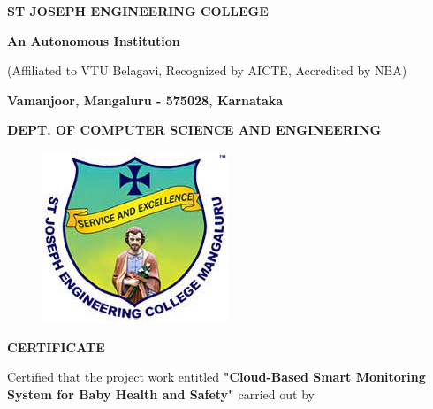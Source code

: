 \documentclass[12pt,a4paper]{report}
\begin{document}
\begin{center}
    \LARGE \textbf{ST JOSEPH ENGINEERING COLLEGE}
    \par
    \Large \textbf{An Autonomous Institution}
    \par \large{(Affiliated to VTU Belagavi, Recognized by AICTE, Accredited by NBA)}
    \par \vspace{3pt}
    \large \textbf{Vamanjoor, Mangaluru - 575028, Karnataka}
    \par \vspace{12pt}
    \par
    \large \textbf{DEPT. OF COMPUTER SCIENCE AND ENGINEERING}
    \par
    \begin{figure}[hbtp]
        \centering
        \includegraphics[scale=0.5]{./pic/sjeclogo}
    \end{figure}


    {\Large \textbf{CERTIFICATE}}
\end{center}
\justifying
\par
{}
\noindent
Certified that the project work entitled \textbf{"Cloud-Based Smart Monitoring System
for Baby Health and Safety"} carried out by\vspace{0.25in}
\par

\noindent
\end{document}
